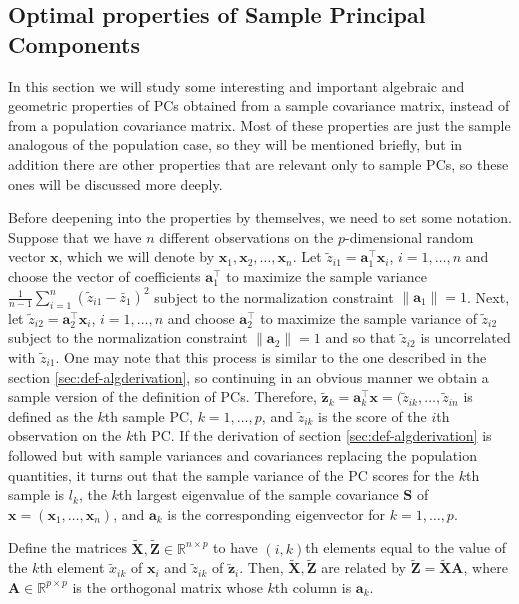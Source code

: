 \documentclass[11pt, oneside]{book}
\theoremstyle{plain}
\theoremstyle{remark}
\newcommand*{\mbf}[1]{\mathbf{#1}}
\begin{document}
\subsection{Optimal properties of Sample Principal
    Components}\label{sec:optprop-sample}
In this section we will study some interesting and important algebraic and
geometric properties of PCs obtained from a sample covariance matrix, instead of
from a population covariance matrix. Most of these properties are just the
sample analogous of the population case, so they will be mentioned briefly, but
in addition there are other properties that are relevant only to sample PCs, so
these ones will be discussed more deeply.

Before deepening into the properties by themselves, we need to set some
notation. Suppose that we have $n$ different observations on the $p$-dimensional
random vector $\mbf{x}$, which we will denote by $\mbf{x}_1, \mbf{x}_2, \dots,
\mbf{x}_n$. Let $\tilde{z}_{i1} = \mbf{a}_1^\top\mbf{x}_i$, $i=1,\dots,n$ and
choose the vector of coefficients $\mbf{a}_1^\top$ to maximize the sample
variance $\frac{1}{n-1}\sum_{i=1}^n(\tilde{z}_{i1} - \bar{z}_1)^2$ subject to
the normalization constraint $\lVert\mbf{a}_1\lVert = 1$. Next, let
$\tilde{z}_{i2} = \mbf{a}_2^\top\mbf{x}_i$, $i=1,\dots,n$ and choose
$\mbf{a}_2^\top$ to maximize the sample variance of $\tilde{z}_{i2}$ subject to
the normalization constraint $\lVert\mbf{a}_2\lVert = 1$ and so that
$\tilde{z}_{i2}$ is uncorrelated with $\tilde{z}_{i1}$. One may note that this
process is similar to the one described in the section
\ref{sec:def-algderivation}, so continuing in an obvious manner we obtain a
sample version of the definition of PCs.  Therefore, $\tilde{\mbf{z}}_k =
\mbf{a}_k^\top\mbf{x} = (\tilde{z}_{ik},\dots, \tilde{z}_{in}$ is defined as the
$k$th sample PC, $k=1,\dots,p$, and $\tilde{z}_{ik}$ is the score of the $i$th
observation on the $k$th PC. If the derivation of section
\ref{sec:def-algderivation} is followed but with sample variances and
covariances replacing the population quantities, it turns out that the sample
variance of the PC scores for the $k$th sample is $l_k$, the $k$th largest
eigenvalue of the sample covariance $\mbf{S}$ of $\mbf{x} = (\mbf{x}_1,\dots,
\mbf{x}_n)$, and $\mbf{a}_k$ is the corresponding eigenvector for $k=1,\dots,p$. 

Define the matrices $\tilde{\mbf{X}}, \tilde{\mbf{Z}}\in\mathbb{R}^{n\times p}$
to have $(i,k)$th elements equal to the value of the $k$th element
$\tilde{x}_{ik}$ of $\mbf{x}_i$ and $\tilde{z}_{ik}$ of $\tilde{\mbf{z}}_i$.
Then, $\tilde{\mbf{X}}, \tilde{\mbf{Z}}$ are related by $\tilde{\mbf{Z}} =
\tilde{\mbf{X}}\mbf{A}$, where $\mbf{A}\in\mathbb{R}^{p\times p}$ is the
orthogonal matrix whose $k$th column is $\mbf{a}_k$. 
\end{document}
